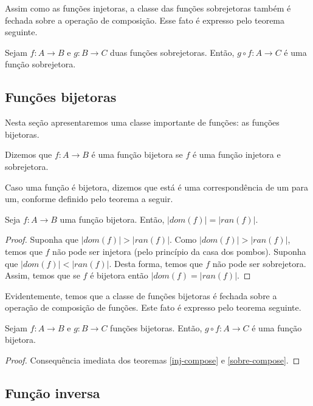 Assim como as funções injetoras, a classe das funções sobrejetoras
também é fechada sobre a operação de composição. Esse fato é expresso
pelo teorema seguinte.

\begin{Theorem}\label{sobre-compose}
Sejam $f : A \to B$ e $g : B \to C$ duas funções sobrejetoras. Então,
$g \circ f : A \to C$ é uma função sobrejetora.
\end{Theorem}

\subsection{Funções bijetoras}

Nesta seção apresentaremos uma classe importante de funções: as
funções bijetoras.

\begin{Definition}
Dizemos que $f : A \to B$ é uma função bijetora se $f$ é uma função
injetora e sobrejetora.
\end{Definition}

Caso uma função é bijetora, dizemos que está é uma correspondência de
um para um, conforme definido pelo teorema a seguir.

\begin{Theorem}
Seja $f : A \to B$ uma função bijetora. Então, $|dom(f)| = |ran(f)|$.
\end{Theorem}
\begin{proof}
Suponha que $|dom(f)| > |ran(f)|$. Como $|dom(f)| > |ran(f)|$, temos
que $f$ não pode ser injetora (pelo princípio da casa dos pombos).
Suponha que $|dom(f)| < |ran(f)|$. Desta forma, temos que
$f$ não pode ser sobrejetora. Assim, temos que se $f$ é bijetora então
$|dom(f) = |ran(f)|$.
\end{proof}

Evidentemente, temos que a classe de funções bijetoras é fechada sobre
a operação de composição de funções. Este fato é expresso pelo teorema
seguinte.

\begin{Theorem}
Sejam $f : A \to B$ e $g : B \to C$ funções bijetoras. Então, $g \circ
f : A \to C$ é uma função bijetora.
\end{Theorem}
\begin{proof}
Consequência imediata dos teoremas \ref{inj-compose} e \ref{sobre-compose}.
\end{proof}

\subsection{Função inversa}

